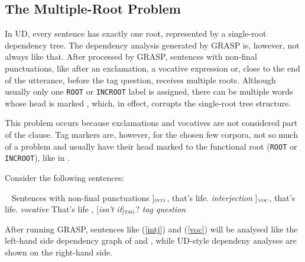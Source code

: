 \subsection{The Multiple-Root Problem}
In UD, every sentence has exactly one root, represented by a single-root dependency tree. The dependency analysis generated by GRASP is, however, not always like that. After processed by GRASP, sentences with non-final punctuations, like after an exclamation, a vocative expression or, close to the end of the utterance, before the tag question, receives multiple roots. Although usually only one \texttt{ROOT} or \texttt{INCROOT} label is assigned, there can be multiple words whose head is marked , which, in effect, corrupts the single-root tree structure.

This problem occurs because exclamations and vocatives are not considered part of the clause. Tag markers are, however, for the chosen few corpora, not so much of a problem and usually have their head marked to the functional root (\texttt{ROOT} or \texttt{INCROOT}), like in .

Consider the following sentences:

\pex~ Sentences with non-final punctuations\label{roots}
\a {[\sl Well\/}]$_{\text{\sc intj}}$, that's life.        \hfill {\sl interjection}\label{intj}
\a {[\sl  Son\/}]$_{\text{\sc voc}}$, that's life.         \hfill {\sl vocative}\label{voc}
\a That's life , {[\sl isn't it}]$_{\text{\sc tag}}$?    \hfill {\sl tag question}\label{tagq}
\xe


After running GRASP, sentences like (\ref{intj}) and (\ref{voc}) will be analysed like the left-hand side dependency graph of  and , while UD-style dependeny analyses are shown on the right-hand side.\\

